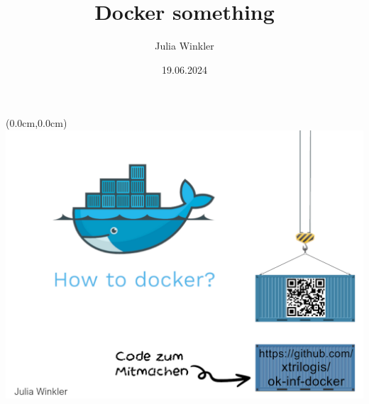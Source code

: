 \documentclass[22pt]{beamer}
\title{Docker something}
\author{Julia Winkler}
\date{19.06.2024}
\begin{document}
\begin{frame}[plain]
    \begin{textblock*}{\paperwidth}(0.0cm,0.0cm) %
        \includegraphics[width=0.99\paperwidth]{Bilder/title.png}
    \end{textblock*}

\end{frame}
\end{document}
